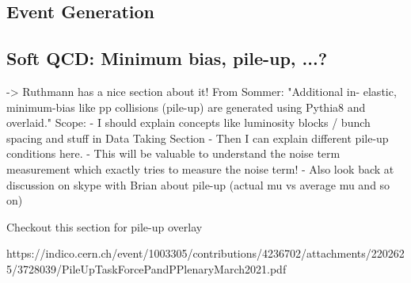 \subsection{Event Generation}




\subsection{Soft QCD: Minimum bias, pile-up, ...?}



->  Ruthmann has a nice section about it!
From Sommer: "Additional in- elastic, minimum-bias like pp collisions (pile-up) are generated using Pythia8 and overlaid."
Scope:
- I should explain concepts like luminosity blocks  / bunch spacing and stuff in Data Taking Section
- Then I can explain different pile-up conditions here.
- This will be valuable to understand the noise term measurement which exactly tries to measure the noise term!
- Also look back at discussion on skype with Brian about pile-up (actual mu vs average mu and so on)

Checkout this section for pile-up overlay

https://indico.cern.ch/event/1003305/contributions/4236702/attachments/2202625/3728039/PileUpTaskForcePandPPlenaryMarch2021.pdf

